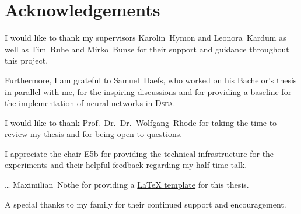 \chapter*{Acknowledgements}

I would like to thank
my supervisors
  Karolin~Hymon and
  Leonora~Kardum
as well as
  Tim~Ruhe and
  Mirko~Bunse
for their support and guidance throughout this project.

Furthermore,
I am grateful to Samuel~Haefs,
  who worked on his Bachelor's thesis in parallel with me,
for the inspiring discussions
and for providing a baseline for the implementation of neural networks in \textsc{Dsea}.

I would like to thank Prof.~Dr.~Dr.~Wolfgang~Rhode for taking the time to
review my thesis
and for being open to questions.

I appreciate the chair E5b for providing the technical infrastructure for the experiments
and their helpful feedback regarding my half-time talk.

… Maximilian~Nöthe for providing a \href{https://github.com/maxnoe/tudothesis}{\LaTeX{} template} for this thesis.


A special thanks to my family for their continued support and encouragement.
